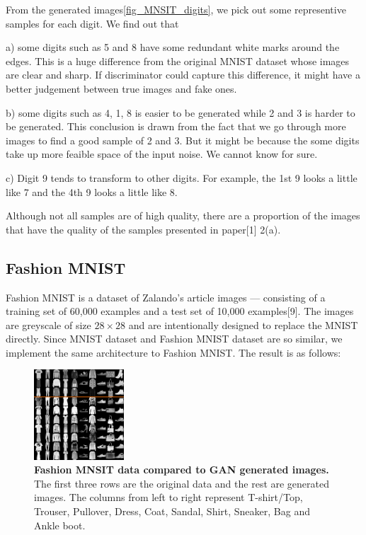 \documentclass{article}
\newcommand{\mycaption}[2]{\caption[#1]{\textbf{#1.} #2}}
\begin{document}
From the generated images\ref{fig_MNSIT_digits}, we pick out some representive samples for each digit. We find out that 

a) some digits such as 5 and 8 have some redundant white marks around the edges. This is a huge difference from the original MNIST dataset whose images are clear and sharp. If discriminator could capture this difference, it might have a better judgement between true images and fake ones.

b) some digits such as 4, 1, 8 is easier to be generated while 2 and 3 is harder to be generated. This conclusion is drawn from the fact that we go through more images to find a good sample of 2 and 3. But it might be because the some digits take up more feaible space of the input noise. We cannot know for sure.

c) Digit 9 tends to transform to other digits. For example, the 1st 9 looks a little like 7 and the 4th 9 looks a little like 8.

Although not all samples are of high quality, there are a proportion of the images that have the quality of the samples presented in paper[1] 2(a).

\subsection{Fashion MNIST}

Fashion MNIST is a dataset of Zalando's article images — consisting of a training set of 60,000 examples and a test set of 10,000 examples[9]. The images are greyscale of size $28\times 28$ and are intentionally designed to replace the MNIST directly.
Since MNIST dataset and Fashion MNIST dataset are so similar, we implement the same architecture to Fashion MNIST. The result is as follows:

\begin{figure}[!htb]
  \centering
  \includegraphics[width=0.3\textwidth]{imgs/Fashion_MNIST_digits.png}
  \mycaption{Fashion MNSIT data compared to GAN generated images}{The first three rows are the original data and the rest are generated images. The columns from left to right represent T-shirt/Top, Trouser, Pullover, Dress, Coat, Sandal, Shirt, Sneaker, Bag and Ankle boot.}
  \label{fig_Fashion_MNSIT}
\end{figure}
\end{document}
